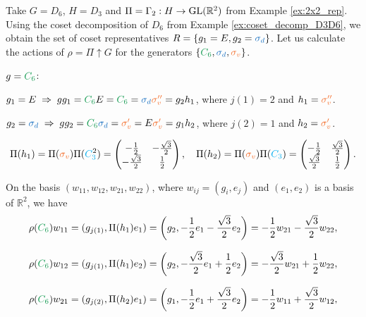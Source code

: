 \begin{example} \label{ex:induced_rep_D3D6}
Take $G = D_6$, $H = D_3$ and $\Pi = \Gamma_2: H \to {\text{GL}}(\mathbb{R}^2)$ from Example \ref{ex:2x2_rep}. Using the coset decomposition of $D_6$ from Example \ref{ex:coset_decomp_D3D6}, we obtain the set of coset representatives $R = \{g_1=E, g_2=\sd\}$. Let us calculate the actions of $\rho = \Pi \uparrow G$ for the generators $\{\Cs, \sd, \sv\}$.

\n

$g = \Cs$:

$g_1 = E \implies g g_1 = \Cs E = \Cs = \sd \svpp = g_2 h_1$, where $j(1) = 2$ and $h_1 = \svpp$.

$g_2 = \sd \implies g g_2 = \Cs \sd = \svp = E \svp = g_1 h_2$, where $j(2) = 1$ and $h_2 = \svp$.

\begin{equation} \label{eq:Pi_h1_Pi_h2_example_inducedrep_D6}
\Pi(h_1) = \Pi(\sv) \Pi(\Ctn{2}) =
\begin{pmatrix}
-\frac{1}{2} & -\frac{\sqrt{3}}{2} \\
-\frac{\sqrt{3}}{2} & \frac{1}{2}
\end{pmatrix},
\quad
\Pi(h_2) = \Pi(\sv) \Pi(\Ct) =
\begin{pmatrix}
-\frac{1}{2} & \frac{\sqrt{3}}{2} \\
\frac{\sqrt{3}}{2} & \frac{1}{2}
\end{pmatrix}.
\end{equation}

On the basis $(w_{11}, w_{12}, w_{21}, w_{22})$, where $w_{ij} = (g_i, e_j)$ and $(e_1, e_2)$ is a basis of $\mathbb{R}^2$, we have
\begin{equation} \label{eq:rhoC6_w11_example_inducedrep_D6}
\rho(\Cs) w_{11} = (g_{j(1)}, \Pi(h_1) e_1) = \qty(g_2, -\frac{1}{2}e_1 - \frac{\sqrt{3}}{2}e_2)
= -\frac{1}{2} w_{21} - \frac{\sqrt{3}}{2} w_{22},
\end{equation}

\begin{equation} \label{eq:rhoC6_w12_example_inducedrep_D6}
\rho(\Cs) w_{12} = (g_{j(1)}, \Pi(h_1) e_2) = \qty(g_2, -\frac{\sqrt{3}}{2}e_1 + \frac{1}{2}e_2)
= -\frac{\sqrt{3}}{2} w_{21} + \frac{1}{2} w_{22},
\end{equation}

\begin{equation} \label{eq:rhoC6_w21_example_inducedrep_D6}
\rho(\Cs) w_{21} = (g_{j(2)}, \Pi(h_2) e_1) = \qty(g_1, -\frac{1}{2}e_1 + \frac{\sqrt{3}}{2}e_2)
= -\frac{1}{2} w_{11} + \frac{\sqrt{3}}{2}w_{12},
\end{equation}


\end{example}
